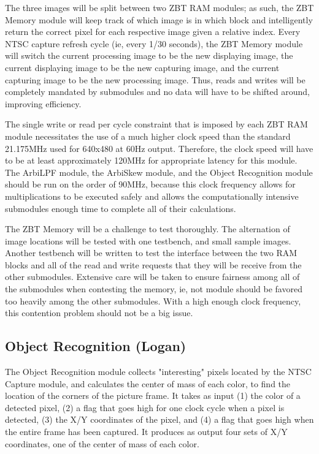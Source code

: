 \documentclass[10pt]{article}
\begin{document}
The three images will be split between two ZBT RAM modules; as such, the ZBT Memory module will keep track of which image is in which block and intelligently return the correct pixel for each respective image given a relative index. Every NTSC capture refresh cycle (ie, every 1/30 seconds), the ZBT Memory module will switch the current processing image to be the new displaying image, the current displaying image to be the new capturing image, and the current capturing image to be the new processing image. Thus, reads and writes will be completely mandated by submodules and no data will have to be shifted around, improving efficiency.

The single write or read per cycle constraint that is imposed by each ZBT RAM module necessitates the use of a much higher clock speed than the standard 21.175MHz used for 640x480 at 60Hz output. Therefore, the clock speed will have to be at least approximately 120MHz for appropriate latency for this module. The ArbiLPF module, the ArbiSkew module, and the Object Recognition module should be run on the order of 90MHz, because this clock frequency allows for multiplications to be executed safely and allows the computationally intensive submodules enough time to complete all of their calculations.

The ZBT Memory will be a challenge to test thoroughly. The alternation of image locations will be tested with one testbench, and small sample images. Another testbench will be written to test the interface between the two RAM blocks and all of the read and write requests that they will be receive from the other submodules. Extensive care will be taken to ensure fairness among all of the submodules when contesting the memory, ie, not module should be favored too heavily among the other submodules. With a high enough clock frequency, this contention problem should not be a big issue.

\subsection{Object Recognition (Logan)}
The Object Recognition module collects "interesting" pixels located by the NTSC Capture module, and calculates the center of mass of each color, to find the location of the corners of the picture frame. It takes as input (1) the color of a detected pixel, (2) a flag that goes high for one clock cycle when a pixel is detected, (3) the X/Y coordinates of the pixel, and (4) a flag that goes high when the entire frame has been captured. It produces as output four sets of X/Y coordinates, one of the center of mass of each color.
\end{document}
